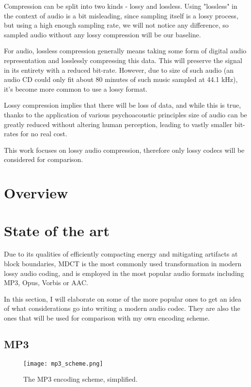 Compression can be split into two kinds - lossy and lossless. Using "lossless" in the context of audio is a bit misleading, since sampling itself is a lossy process, but using a high enough sampling rate, we will not notice any difference, so sampled audio without any lossy compression will be our baseline.

For audio, lossless compression generally means taking some form of digital audio representation and losslessly compressing this data. This will preserve the signal in its entirety with a reduced bit-rate. However, due to size of such audio (an audio CD could only fit about 80 minutes of such music sampled at 44.1 kHz), it's become more common to use a lossy format.

Lossy compression implies that there will be loss of data, and while this is true, thanks to the application of various psychoacoustic principles size of audio can be greatly reduced without altering human perception, leading to vastly smaller bit-rates for no real cost.

This work focuses on lossy audio compression, therefore only lossy codecs will be considered for comparison.

\section{Overview}

\section{State of the art}
\label{sec:stateoftheart}
Due to its qualities of efficiently compacting energy and mitigating artifacts at block boundaries, MDCT is the most commonly used transformation in modern lossy audio coding, and is employed in the most popular audio formats including MP3, Opus, Vorbis or AAC.

In this section, I will elaborate on some of the more popular ones to get an idea of what considerations go into writing a modern audio codec. They are also the ones that will be used for comparison with my own encoding scheme.

\subsection{MP3}
\label{sec:mp3}
\begin{figure}[ht]
	\caption[MP3 encoding scheme]{The MP3 encoding scheme, simplified.}
	\label{fig:mp3_scheme}
	\centering
	\texttt{[image: mp3\_scheme.png]}
\end{figure}

